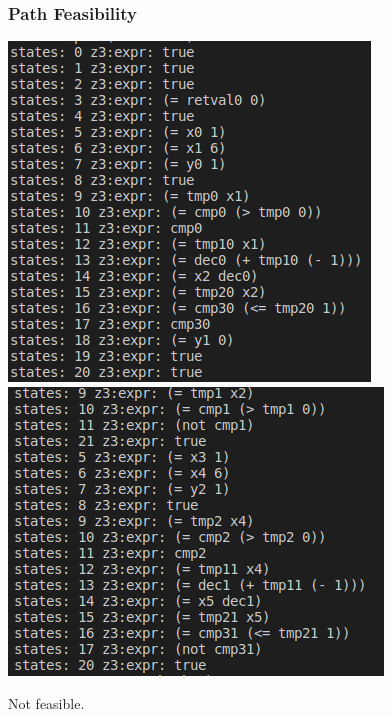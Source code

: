 \documentclass[11pt]{beamer}
\begin{document}
\begin{frame}\frametitle{Path Feasibility}

\includegraphics[scale=0.4]{p1.png}
\includegraphics[scale=0.4]{p2.png}

Not feasible.
\end{frame}
\end{document}

